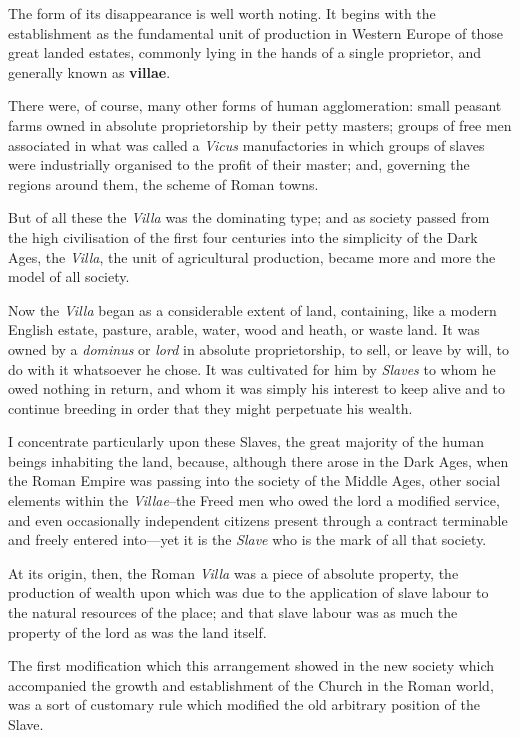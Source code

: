 \documentclass{book}
\begin{document}
The form of its disappearance is well worth noting. It begins with the establishment as the fundamental unit of production in Western Europe of those great landed estates, commonly lying in the hands of a single proprietor, and generally known as \textbf{villae}.

There were, of course, many other forms of human agglomeration: small peasant farms owned in absolute proprietorship by their petty masters; groups of free men associated in what was called a \emph{Vicus} manufactories in which groups of slaves were industrially organised to the profit of their master; and, governing the regions around them, the scheme of Roman towns.

But of all these the \emph{Villa} was the dominating type; and as society passed from the high civilisation of the first four centuries into the simplicity of the Dark Ages, the \emph{Villa}, the unit of agricultural production, became more and more the model of all society.

Now the \emph{Villa} began as a considerable extent of land, containing, like a modern English estate, pasture, arable, water, wood and heath, or waste land. It was owned by a \emph{dominus} or \emph{lord} in absolute proprietorship, to sell, or leave by will, to do with it whatsoever he chose. It was cultivated for him by \emph{Slaves} to whom he owed nothing in return, and whom it was simply his interest to keep alive and to continue breeding in order that they might perpetuate his wealth.

I concentrate particularly upon these Slaves, the great majority of the human beings inhabiting the land, because, although there arose in the Dark Ages, when the Roman Empire was passing into the society of the Middle Ages, other social elements within the \emph{Villae}–the Freed men who owed the lord a modified service, and even occasionally independent citizens present through a contract terminable and freely entered into—yet it is the \emph{Slave} who is the mark of all that society.

At its origin, then, the Roman \emph{Villa} was a piece of absolute property, the production of wealth upon which was due to the application of slave labour to the natural resources of the place; and that slave labour was as much the property of the lord as was the land itself.

The first modification which this arrangement showed in the new society which accompanied the growth and establishment of the Church in the Roman world, was a sort of customary rule which modified the old arbitrary position of the Slave.
\end{document}
